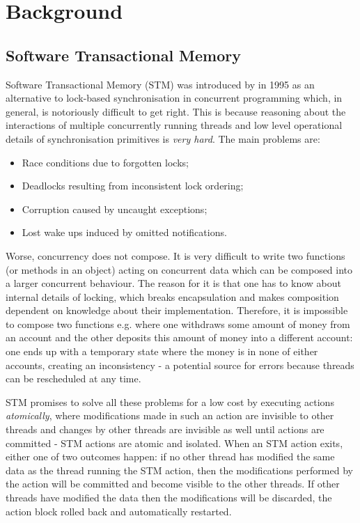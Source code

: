 \section{Background}
\label{sec:background}

\subsection{Software Transactional Memory}
Software Transactional Memory (STM) was introduced by \cite{shavit_software_1995} in 1995 as an alternative to lock-based synchronisation in concurrent programming which, in general, is notoriously difficult to get right. This is because reasoning about the interactions of multiple concurrently running threads and low level operational details of synchronisation primitives is \textit{very hard}. The main problems are:

\begin{itemize}
	\item Race conditions due to forgotten locks;
	\item Deadlocks resulting from inconsistent lock ordering;
	\item Corruption caused by uncaught exceptions;
	\item Lost wake ups induced by omitted notifications.
\end{itemize}

Worse, concurrency does not compose. It is very difficult to write two functions (or methods in an object) acting on concurrent data which can be composed into a larger concurrent behaviour. The reason for it is that one has to know about internal details of locking, which breaks encapsulation and makes composition dependent on knowledge about their implementation. Therefore, it is impossible to compose two  functions e.g. where one withdraws some amount of money from an account and the other deposits this amount of money into a different account: one ends up with a temporary state where the money is in none of either accounts, creating an inconsistency - a potential source for errors because threads can be rescheduled at any time.

STM promises to solve all these problems for a low cost by executing actions \textit{atomically}, where modifications made in such an action are invisible to other threads and changes by other threads are invisible as well until actions are committed - STM actions are atomic and isolated. When an STM action exits, either one of two outcomes happen: if no other thread has modified the same data as the thread running the STM action, then the modifications performed by the action will be committed and become visible to the other threads. If other threads have modified the data then the modifications will be discarded, the action block rolled back and automatically restarted.

